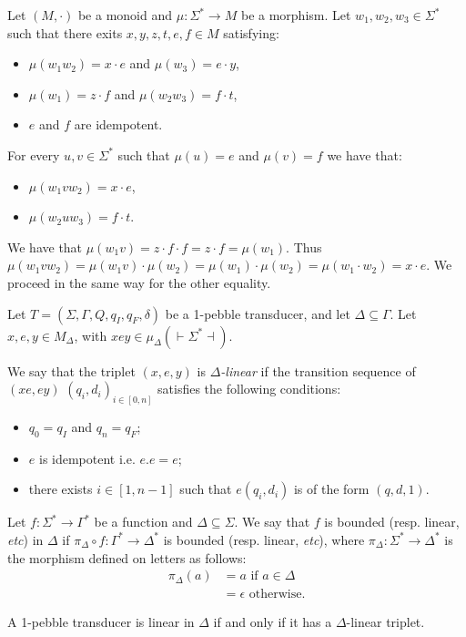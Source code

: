 \begin{lemma}\label{lem:2idem}
Let $(M,\cdot)$ be a monoid and $\mu:\Sigma^*\to M$ be a morphism. Let $w_1,w_2, w_3\in\Sigma^*$ such that there exits $x,y,z,t,e,f\in M$ satisfying:
\begin{itemize}
\item $\mu(w_1w_2)=x\cdot e$ and $\mu(w_3)=e\cdot y$,
\item $\mu(w_1)=z\cdot f$ and $\mu(w_2w_3)=f\cdot t$,
\item $e$ and $f$ are idempotent.
\end{itemize}
For every $u, v\in\Sigma^*$ such that $\mu(u)=e$ and $\mu(v)=f$ we have that:
\begin{itemize}
\item $\mu(w_1vw_2)=x\cdot e$, 
\item $\mu(w_2uw_3)=f\cdot t$.
\end{itemize}
\end{lemma}

\begin{pr}
We have that $\mu(w_1v)=z\cdot f\cdot f=z\cdot f=\mu(w_1)$.
Thus $\mu(w_1vw_2)=\mu(w_1v)\cdot \mu(w_2)=\mu(w_1)\cdot \mu(w_2)=\mu(w_1\cdot w_2) =x\cdot e$.
We proceed in the same way for the other equality.
\end{pr}

\begin{definition}
Let $T=(\Sigma,\Gamma,Q,q_I,q_F, \delta)$ be a 1-pebble transducer, and let $\Delta\subseteq \Gamma$. Let $x, e, y\in M_\Delta$, with $xey\in \mu_\Delta( { \vdash}\Sigma^*{ \dashv})$.

We say that the triplet $(x,e,y)$ is \emph{$\Delta$-linear} if the transition sequence of $(xe,ey)$
$(q_i,d_i)_{i\in[0,n]}$ satisfies the following conditions:
\begin{itemize}
\item $q_0=q_I$ and $q_n=q_F$;
\item $e$ is idempotent i.e. $e.e=e$;
\item there exists $i\in [1,n-1]$ such that $e(q_i,d_i)$ is of the form $(q,d,1)$.
\end{itemize}
\end{definition}

 \begin{definition}
Let $f:\Sigma^*\to \Gamma^*$ be a function and $\Delta\subseteq\Sigma$. We say that $f$ is bounded (resp. linear, \textit{etc}) in $\Delta$ if $\pi_\Delta\circ f: \Gamma^*\to \Delta^*$ is bounded (resp. linear, \textit{etc}), where $\pi_\Delta:\Sigma^*\to \Delta^*$ is the morphism defined on letters as follows:
\begin{align*}
\pi_\Delta(a)&=a \text{ if }  a\in \Delta \\
&= \epsilon \text{ otherwise.}
\end{align*}
 \end{definition}
 
\begin{theorem}\label{thm:linear}
A 1-pebble transducer is linear in $\Delta$ if and only if it has a $\Delta$-linear triplet.
\end{theorem}